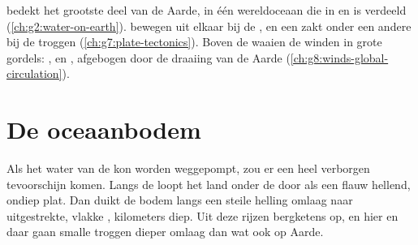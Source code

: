 \begin{recall}
 bedekt het grootste deel van de Aarde, in één wereldoceaan die
in  en  is verdeeld (\cref{ch:g2:water-on-earth}). 
bewegen uit elkaar bij de , en een  zakt onder een
andere bij de troggen (\cref{ch:g7:plate-tectonics}). Boven de 
waaien de winden in grote gordels: ,  en , afgebogen door de draaiing van de Aarde
(\cref{ch:g8:winds-global-circulation}).
\end{recall}

\section{De oceaanbodem}

Als het water van de  kon worden weggepompt, zou er een heel
verborgen  tevoorschijn komen. Langs de  loopt het land
onder de  door als een flauw hellend, ondiep plat. Dan duikt de bodem
langs een steile helling omlaag naar uitgestrekte, vlakke ,
kilometers diep. Uit deze  rijzen bergketens op, en hier en daar
gaan smalle troggen dieper omlaag dan wat ook op Aarde.

